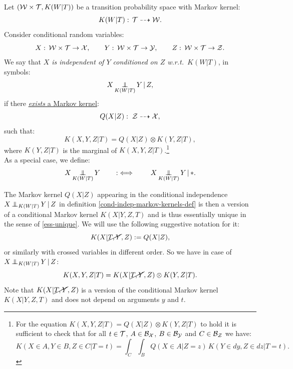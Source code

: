\begin{Def}
\label{cond-indep-markov-kernels-def}
Let $(\mathcal{W} \times \mathcal{T}, K(W|T))$ be a transition probability space with Markov kernel:
\[K(W|T): \, \mathcal{T} \dashrightarrow  \mathcal{W}.\]
Consider conditional random variables: 
\[ X:\, \mathcal{W} \times \mathcal{T} \to \mathcal{X}, \qquad Y:\,\mathcal{W} \times \mathcal{T} \to \mathcal{Y}, \qquad
Z:\,\mathcal{W} \times \mathcal{T} \to \mathcal{Z}.\]
We say that \emph{$X$ is independent of $Y$ conditioned on $Z$ w.r.t.\ $K(W|T)$}, in symbols:
\[X \operatorname*{\perp\mkern-11mu\perp}_{K(W|T)} Y \operatorname*{|} Z, \]
if there \underline{\emph{exists} a Markov kernel}: 
\[ Q(X|Z):\; \mathcal{Z} \dashrightarrow \mathcal{X},\]
such that:
\[ K(X,Y,Z|T) = Q(X|Z) \otimes K(Y,Z|T),\]
where $K(Y,Z|T)$ is the marginal of $K(X,Y,Z|T)$.\footnote{
For the equation $K(X,Y,Z|T) = Q(X|Z) \otimes K(Y,Z|T)$ to hold it is sufficient to check that for all $t \in \mathcal{T}$, $A \in \mathcal{B}_{\mathcal{X}}$, $B \in \mathcal{B}_{\mathcal{Y}}$ and $C \in \mathcal{B}_{\mathcal{Z}}$ we have:
\[ K(X \in A, Y \in B, Z \in C |T=t) = \int_C \int_B  Q(X \in A|Z=z)\, K(Y \in dy, Z \in dz|T=t). \]
}\\
As a special case, we define:
\[X \operatorname*{\perp\mkern-11mu\perp}_{K(W|T)} Y \qquad :\iff \qquad X \operatorname*{\perp\mkern-11mu\perp}_{K(W|T)} Y \operatorname*{|} \ast. \]
\end{Def}



\begin{Not}
        The Markov kernel $Q(X|Z)$ appearing in the conditional independence $X \operatorname*{\perp\mkern-11mu\perp}_{K(W|T)} Y \operatorname*{|} Z$ in definition \ref{cond-indep-markov-kernels-def} is then a version of a conditional Markov kernel $K(X|Y,Z,T)$ and is thus essentially unique in the sense of \ref{ess-unique}.
    We will use the following suggestive notation for it:
    \[ K(X|\cancel{T,Y},Z) := Q(X|Z),\]
    or similarly with crossed variables in different order.
    So we have in case of $X \operatorname*{\perp\mkern-11mu\perp}_{K(W|T)} Y \operatorname*{|} Z$:
\[ K(X,Y,Z|T) = K(X|\cancel{T,Y},Z)\otimes K(Y,Z|T).\]
Note that $K(X|\cancel{T,Y},Z)$ is a version of the conditional Markov kernel $K(X|Y,Z,T)$ and does not depend on arguments $y$ and $t$.
\end{Not}

